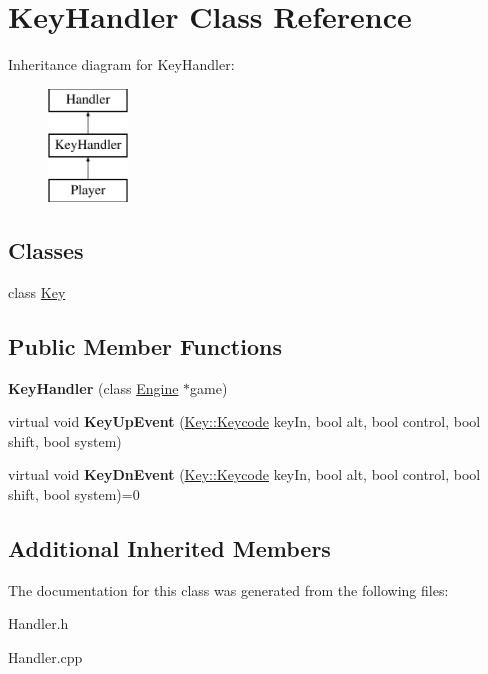 \hypertarget{class_key_handler}{}\section{Key\+Handler Class Reference}
\label{class_key_handler}
Inheritance diagram for Key\+Handler\+:\begin{figure}[H]
\begin{center}
\leavevmode
\includegraphics[height=3.000000cm]{class_key_handler}
\end{center}
\end{figure}
\subsection*{Classes}
\begin{DoxyCompactItemize}
\item 
class \hyperlink{class_key_handler_1_1_key}{Key}
\end{DoxyCompactItemize}
\subsection*{Public Member Functions}
\begin{DoxyCompactItemize}
\item 
\hypertarget{class_key_handler_a37dacf5fdd9bb28162562b5b584b49b3}{}\label{class_key_handler_a37dacf5fdd9bb28162562b5b584b49b3} 
{\bfseries Key\+Handler} (class \hyperlink{class_engine}{Engine} $\ast$game)
\item 
\hypertarget{class_key_handler_ab62ed8038ace8783cfb6d2dea1a8821d}{}\label{class_key_handler_ab62ed8038ace8783cfb6d2dea1a8821d} 
virtual void {\bfseries Key\+Up\+Event} (\hyperlink{class_key_handler_1_1_key_a832541e186986ff9f6bd5a810ed5c164}{Key\+::\+Keycode} key\+In, bool alt, bool control, bool shift, bool system)
\item 
\hypertarget{class_key_handler_ac497fa48f5e4fc6e133c110a018f6fb3}{}\label{class_key_handler_ac497fa48f5e4fc6e133c110a018f6fb3} 
virtual void {\bfseries Key\+Dn\+Event} (\hyperlink{class_key_handler_1_1_key_a832541e186986ff9f6bd5a810ed5c164}{Key\+::\+Keycode} key\+In, bool alt, bool control, bool shift, bool system)=0
\end{DoxyCompactItemize}
\subsection*{Additional Inherited Members}


The documentation for this class was generated from the following files\+:\begin{DoxyCompactItemize}
\item 
Handler.\+h\item 
Handler.\+cpp\end{DoxyCompactItemize}
